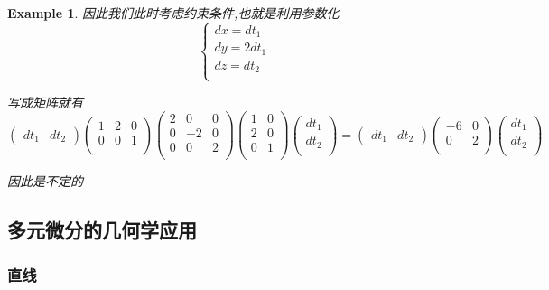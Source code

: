 \documentclass[11pt,hyperref,a4paper,UTF8]{ctexart}
\newtheorem{example}{Example}[subsection]
\begin{document}
\begin{CJK}{UTF8}{gkai}
\begin{example}
  因此我们此时考虑约束条件,也就是利用参数化
  \[\begin{cases}
    dx = dt_1\\
    dy = 2dt_1\\
    dz = dt_2\\
  \end{cases}\]

  写成矩阵就有
  \[\begin{pmatrix}
    dt_1&dt_2
  \end{pmatrix}
  \begin{pmatrix}
    1&2&0\\
    0&0&1\\
  \end{pmatrix}
  \begin{pmatrix}
    2 & 0 & 0\\
    0& -2 & 0\\
    0 & 0 & 2\\
  \end{pmatrix}
  \begin{pmatrix}
    1&0\\
    2&0\\
    0&1\\
  \end{pmatrix}
  \begin{pmatrix}
    dt_1\\
    dt_2\\
  \end{pmatrix}
  =
  \begin{pmatrix}
    dt_1&dt_2
  \end{pmatrix}
  \begin{pmatrix}
    -6&0\\
    0&2\\
  \end{pmatrix}
  \begin{pmatrix}
    dt_1\\
    dt_2\\
  \end{pmatrix}
  \]

  因此是不定的
\end{example}

\subsection{多元微分的几何学应用}

\subsubsection{直线}

\end{CJK}
\end{document}
